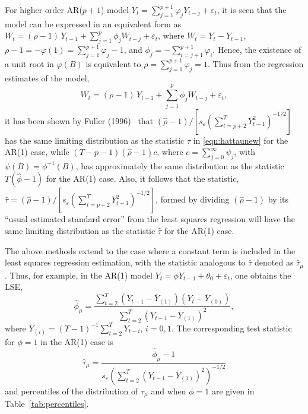 For higher order AR($p+1$) model $Y_t = \sum_{j=1}^{p+1}\varphi_j Y_{t-j} + \varepsilon_t$, it is seen that the model can be expressed in an equivalent form as $W_t = (\rho - 1)\, Y_{t-1} + \sum_{j=1}^p \phi_jW_{t-j} + \varepsilon_t$, where $W_t = Y_t - Y_{t-1}$, $\rho - 1 = -\varphi(1) = \sum_{j=1}^{p+1} \varphi_j - 1$, and $\phi_j = -\sum_{i=j+1}^{p+1} \varphi_i$. Hence, the existence of a unit root in $\varphi(B)$ is equivalent to $\rho = \sum_{j=1}^{p+1} \varphi_j = 1$. Thus from the regression estimates of the model, 
	\begin{equation} \label{eqn:wtnew}
	W_t  = (\rho - 1)\, Y_{t-1} + \sum_{j=1}^p \phi_j W_{t-j} + \varepsilon_t ,
	\end{equation}
it has been shown by Fuller (1996)~\cite[Chapter 10]{fuller1996} that $(\hat{\rho} - 1)/[s_\varepsilon(\sum_{t=p+2}^T Y_{t-1}^2)^{-1/2}]$ has the same limiting distribution as the statistic $\hat{\tau}$ in \eqref{eqn:hattaunew} for the AR(1) case, while $(T- p - 1)(\hat{\rho} - 1) c$, where $c = \sum_{j=0}^\infty \psi_j$, with $\psi(B) = \phi^{-1}(B)$, has approximately the same distribution as the statistic $T(\hat{\phi} - 1)$ for the AR(1) case. Also, it follows that the statistic, $\hat{\tau}= (\hat{\rho} - 1)/[s_{\varepsilon}(\sum_{t= p+2}^T Y_{t-1}^2)^{-1/2}]$, formed by dividing $(\hat{\rho} - 1)$ by its ``usual estimated standard error'' from the least squares regression will have the same limiting distribution as the statistic $\hat{\tau}$ for the AR(1) case.


The above methods extend to the case where a constant term is included in the least squares regression estimation, with the statistic analogous to $\hat{\tau}$ denoted as $\hat{\tau}_\mu$. Thus, for example, in the AR(1) model $Y_t = \phi Y_{t-1} + \theta_0 + \varepsilon_t$, one obtains the LSE,
	\begin{equation} \label{eqn:hatphinewest}
	\widehat{\phi}_{\mu} = \dfrac{\sum_{t=2}^T(Y_{t-1} - \overline{Y}_{(1)})(Y_t - \overline{Y}_{(0)})}{\sum_{t=2}^T(Y_{t-1} - \overline{Y}_{(1)})^2},
	\end{equation}
where $\overline{Y}_{(i)} = (T - 1)^{-1}\sum_{t=2}^TY_{t-i}$, $i = 0,1$. The corresponding test statistic for $\phi = 1$ in the AR(1) case is
	\begin{equation} \label{eqn:anotherhattau}
	\hat{\tau}_\mu = \dfrac{\widehat{\phi}_\mu - 1}{s_{\varepsilon} \left( \sum_{t=2}^T(Y_{t-1} - \overline{Y}_{(1)})^2 \right)^{-1/2}}
	\end{equation}
and percentiles of the distribution of $\hat{\tau}_\mu$ and when $\phi = 1$ are given in Table~\ref{tab:percentiles}.

